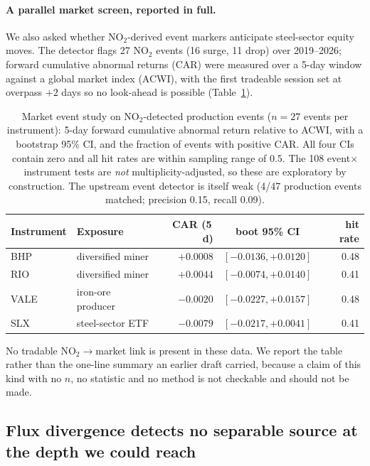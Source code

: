 \documentclass[11pt,a4paper]{article}
\providecommand{\ce}[1]{\ensuremath{\mathrm{#1}}}
\begin{document}
\paragraph{A parallel market screen, reported in full.} We also asked whether \ce{NO_2}-derived
event markers anticipate steel-sector equity moves. The detector flags 27 \ce{NO_2} events
(16 surge, 11 drop) over 2019--2026; forward cumulative abnormal returns (CAR) were measured over
a 5-day window against a global market index (ACWI), with the first tradeable session set at
overpass $+2$ days so no look-ahead is possible (Table~\ref{tab:market}).

\begin{table}[t]
\centering
\caption{Market event study on \ce{NO_2}-detected production events ($n=27$ events per
instrument): 5-day forward cumulative abnormal return relative to ACWI, with a
bootstrap 95\% CI, and the fraction of events with positive CAR. All four CIs contain zero and
all hit rates are within sampling range of $0.5$. The 108 event$\times$instrument tests are
\emph{not} multiplicity-adjusted, so these are exploratory by construction. The upstream event
detector is itself weak (4/47 production events matched; precision 0.15, recall 0.09).}
\label{tab:market}
\small
\begin{tabular}{llrcr}
\toprule
Instrument & Exposure & CAR (5\,d) & boot 95\% CI & hit rate \\
\midrule
BHP  & diversified miner        & $+0.0008$ & $[-0.0136,+0.0120]$ & 0.48 \\
RIO  & diversified miner        & $+0.0044$ & $[-0.0074,+0.0140]$ & 0.41 \\
VALE & iron-ore producer        & $-0.0020$ & $[-0.0227,+0.0157]$ & 0.48 \\
SLX  & steel-sector ETF         & $-0.0079$ & $[-0.0217,+0.0041]$ & 0.41 \\
\bottomrule
\end{tabular}
\end{table}

No tradable \ce{NO_2}$\rightarrow$market link is present in these data. We report the table rather
than the one-line summary an earlier draft carried, because a claim of this kind with no $n$, no
statistic and no method is not checkable and should not be made.

\subsection{Flux divergence detects no separable source at the depth we could reach}
\label{sec:flux}
\end{document}
